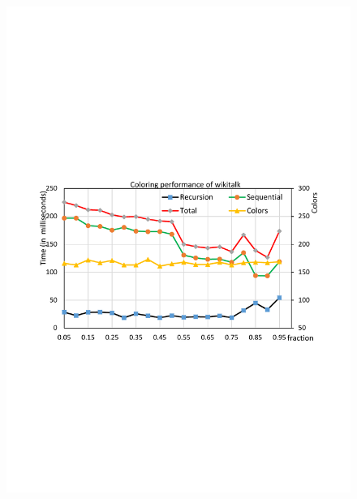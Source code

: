 \begin{figure}[t]
{		\includegraphics[scale=0.2]{figure/exp/wiki.pdf}
	}\\
	\subfloat[LiveJournal]{
		\label{fig:livejournal}
}
\end{figure}
